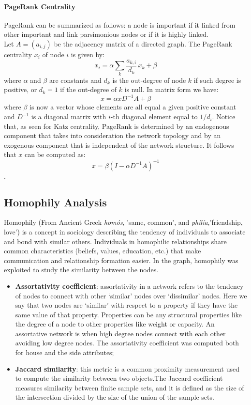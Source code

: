 \documentclass[10pt,twocolumn,letterpaper]{article}
\begin{document}
\paragraph{PageRank Centrality}

PageRank can be summarized as follows: a node is important if it linked from other important and link parsimonious nodes or if it is highly linked.\\
Let $A = (a_{i,j})$ be the adjacency matrix of a directed graph. The PageRank centrality $x_{i}$ of node $i$ is given by: $$x_i = \alpha \sum_k \frac{a_{k,i}}{d_k} \, x_k + \beta$$ where $\alpha$ and $\beta$ are constants and $d_k$ is the out-degree of node $k$ if such degree is positive, or $d_k = 1$ if the out-degree of $k$ is null. In matrix form we have: $$x = \alpha x D^{-1}A + \beta$$ where $\beta$ is now a vector whose elements are all equal a given positive constant and $D^{-1}$ is a diagonal matrix with $i$-th diagonal element equal to $1/d_{i}$. Notice that, as seen for Katz centrality, PageRank is determined by an endogenous component that takes into consideration the network topology and by an exogenous component that is independent of the network structure. It follows that $x$ can be computed as: $$x = \beta (I - \alpha D^{-1}A)^{-1}$$.


\subsection{Homophily Analysis}

Homophily (From Ancient Greek \textit{homós}, 'same, common', and \textit{philía},'friendship, love') is a concept in sociology describing the tendency of individuals to associate and bond with similar others. Individuals in homophilic relationships share common characteristics (beliefs, values, education, etc.) that make communication and relationship formation easier.
In the graph, homophily was exploited to study the similarity between the nodes.

\begin{itemize}
    \item \textbf{Assortativity coefficient}: assortativity in a network refers to the tendency of nodes to
connect with other ‘similar’ nodes over ‘dissimilar’ nodes.
Here we say that two nodes are ‘similar’ with respect to a property if they have the same
value of that property. Properties can be any structural properties like the degree of a
node to other properties like weight or capacity. An assortative network is when high
degree nodes connect with each other avoiding low degree nodes.
The assortativity coefficient was computed both for house and the side attributes;
\item \textbf{Jaccard similarity}: this metric is a common proximity measurement used to compute
the similarity between two objects.The Jaccard coefficient measures similarity between finite sample sets, and it is defined as the size of the intersection divided by the size of the union of the sample sets.
\end{itemize}
\end{document}
